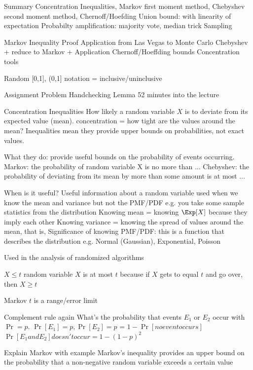 
Summary
Concentration Inequalities, Markov first moment method, Chebyshev second moment method, Chernoff/Hoefding
Union bound: with linearity of expectation
Probabilty amplification: majority vote, median trick
Sampling




Markov Inequality Proof
Application from Las Vegas to Monte Carlo 
Chebyshev + reduce to Markov + Application
Chernoff/Hoeffding bounds
Concentration tools


Random
[0,1], (0,1] notation = inclusive/uninclusive

Assignment
Problem Handchecking Lemma 52 minutes into the lecture

Concentration Inequalities
How likely a random variable $X$ is to deviate from its expected value (mean).
concentration = how tight are the values around the mean?
Inequalities mean they provide upper bounds on probabilities, not exact values.

What they do: provide useful bounds on the probability of events occurring.
Markov: the probability of random variable X is no more than $\dots$
Chebyshev: the probability of deviating from its mean by more than some amount is at most $\dots$

When is it useful?
Useful information about a random variable
used when we know the mean and variance but not the PMF/PDF e.g. you take some sample statistics from the distribution
Knowing mean = knowing $\Exp[X]$ because they imply each other
Knowing variance = knowing the spread of values around the mean, that is, 
Significance of knowing PMF/PDF: this is a function that describes the distribution e.g. Normal (Gaussian), Exponential, Poisson

Used in the analysis of randomized algorithms

$X \leq t$ random variable $X$ is at most $t$ because if $X$ gets to equal $t$ and go over, then $X \geq t$

Markov
$t$ is a range/error limit

Complement rule again
What's the probability that events $E_1$ or $E_2$ occur with $\Pr = p$.
$\Pr[E_1] = p,\Pr[E_2] = p$
=
$1 - \Pr[no event occurs]$
$\Pr[E_1 and E_2] doesn't occur = 1 - (1-p)^2$


Explain Markov with example
Markov's inequality provides an upper bound on the probability that a non-negative random variable exceeds a certain value

